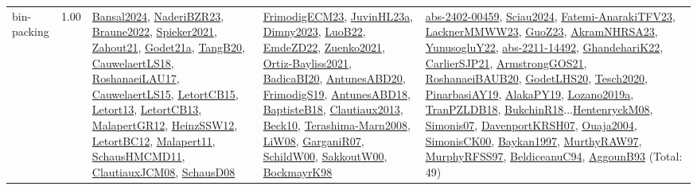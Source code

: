 {\begin{longtable}{p{3cm}r>{\raggedright\arraybackslash}p{6cm}>{\raggedright\arraybackslash}p{6cm}>{\raggedright\arraybackslash}p{8cm}}
\index{bin-packing}\index{Constraints!bin-packing}bin-packing &  1.00 & \hyperref[detail:Bansal2024]{Bansal2024}, \hyperref[detail:NaderiBZR23]{NaderiBZR23}, \hyperref[detail:Braune2022]{Braune2022}, \hyperref[detail:Spieker2021]{Spieker2021}, \hyperref[detail:Zahout21]{Zahout21}, \hyperref[detail:Godet21a]{Godet21a}, \hyperref[detail:TangB20]{TangB20}, \hyperref[detail:CauwelaertLS18]{CauwelaertLS18}, \hyperref[detail:RoshanaeiLAU17]{RoshanaeiLAU17}, \hyperref[detail:CauwelaertLS15]{CauwelaertLS15}, \hyperref[detail:LetortCB15]{LetortCB15}, \hyperref[detail:Letort13]{Letort13}, \hyperref[detail:LetortCB13]{LetortCB13}, \hyperref[detail:MalapertGR12]{MalapertGR12}, \hyperref[detail:HeinzSSW12]{HeinzSSW12}, \hyperref[detail:LetortBC12]{LetortBC12}, \hyperref[detail:Malapert11]{Malapert11}, \hyperref[detail:SchausHMCMD11]{SchausHMCMD11}, \hyperref[detail:ClautiauxJCM08]{ClautiauxJCM08}, \hyperref[detail:SchausD08]{SchausD08} & \hyperref[detail:FrimodigECM23]{FrimodigECM23}, \hyperref[detail:JuvinHL23a]{JuvinHL23a}, \hyperref[detail:Dimny2023]{Dimny2023}, \hyperref[detail:LuoB22]{LuoB22}, \hyperref[detail:EmdeZD22]{EmdeZD22}, \hyperref[detail:Zuenko2021]{Zuenko2021}, \hyperref[detail:Ortiz-Bayliss2021]{Ortiz-Bayliss2021}, \hyperref[detail:BadicaBI20]{BadicaBI20}, \hyperref[detail:AntunesABD20]{AntunesABD20}, \hyperref[detail:FrimodigS19]{FrimodigS19}, \hyperref[detail:AntunesABD18]{AntunesABD18}, \hyperref[detail:BaptisteB18]{BaptisteB18}, \hyperref[detail:Clautiaux2013]{Clautiaux2013}, \hyperref[detail:Beck10]{Beck10}, \hyperref[detail:Terashima-Marn2008]{Terashima-Marn2008}, \hyperref[detail:LiW08]{LiW08}, \hyperref[detail:GarganiR07]{GarganiR07}, \hyperref[detail:SchildW00]{SchildW00}, \hyperref[detail:SakkoutW00]{SakkoutW00}, \hyperref[detail:BockmayrK98]{BockmayrK98} & \hyperref[detail:abs-2402-00459]{abs-2402-00459}, \hyperref[detail:Sciau2024]{Sciau2024}, \hyperref[detail:Fatemi-AnarakiTFV23]{Fatemi-AnarakiTFV23}, \hyperref[detail:LacknerMMWW23]{LacknerMMWW23}, \hyperref[detail:GuoZ23]{GuoZ23}, \hyperref[detail:AkramNHRSA23]{AkramNHRSA23}, \hyperref[detail:YunusogluY22]{YunusogluY22}, \hyperref[detail:abs-2211-14492]{abs-2211-14492}, \hyperref[detail:GhandehariK22]{GhandehariK22}, \hyperref[detail:CarlierSJP21]{CarlierSJP21}, \hyperref[detail:ArmstrongGOS21]{ArmstrongGOS21}, \hyperref[detail:RoshanaeiBAUB20]{RoshanaeiBAUB20}, \hyperref[detail:GodetLHS20]{GodetLHS20}, \hyperref[detail:Tesch2020]{Tesch2020}, \hyperref[detail:PinarbasiAY19]{PinarbasiAY19}, \hyperref[detail:AlakaPY19]{AlakaPY19}, \hyperref[detail:Lozano2019a]{Lozano2019a}, \hyperref[detail:TranPZLDB18]{TranPZLDB18}, \hyperref[detail:BukchinR18]{BukchinR18}...\hyperref[detail:HentenryckM08]{HentenryckM08}, \hyperref[detail:Simonis07]{Simonis07}, \hyperref[detail:DavenportKRSH07]{DavenportKRSH07}, \hyperref[detail:Ouaja2004]{Ouaja2004}, \hyperref[detail:SimonisCK00]{SimonisCK00}, \hyperref[detail:Baykan1997]{Baykan1997}, \hyperref[detail:MurthyRAW97]{MurthyRAW97}, \hyperref[detail:MurphyRFSS97]{MurphyRFSS97}, \hyperref[detail:BeldiceanuC94]{BeldiceanuC94}, \hyperref[detail:AggounB93]{AggounB93} (Total: 49)\\

\end{longtable}}
